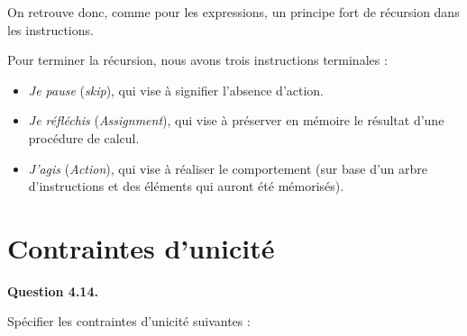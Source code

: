 \documentclass[oneside,a4paper]{book}
\begin{document}
On retrouve donc, comme pour les expressions, un principe fort de récursion dans les instructions.

Pour terminer la récursion, nous avons trois instructions terminales :
\begin{itemize}
    \item \textit{Je pause} (\textit{skip}), qui vise à signifier l'absence d'action.
    \item \textit{Je réfléchis} (\textit{Assignment}), qui vise à préserver en mémoire le résultat d'une procédure de calcul.
    \item \textit{J'agis} (\textit{Action}), qui vise à réaliser le comportement (sur base d'un arbre d'instructions et des éléments qui auront été mémorisés).
\end{itemize}

\section{Contraintes d'unicité}


\textbf{Question 4.14.}\label{Question 4.14.}\newline

\nopagebreak 

Spécifier les contraintes d'unicité suivantes :
\end{document}
